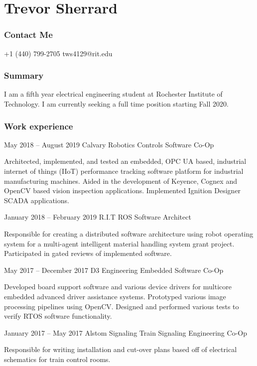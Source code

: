 \documentclass{tccv}
\begin{document}
\part{Trevor Sherrard}
\section{Contact Me}
\begin{eventlist}
    {+1 (440) 799-2705}
    {tws4129@rit.edu}
    
\end{eventlist}

\section{Summary}
I am a fifth year electrical engineering student at Rochester Institute of Technology. I am currently seeking a full time position starting Fall 2020.

\section{Work experience}

\begin{eventlist}

\item{May 2018 -- August 2019}
     {Calvary Robotics}
     {Controls Software Co-Op}

Architected, implemented, and tested an embedded, OPC UA based, industrial internet of things (IIoT) performance tracking software platform for industrial manufacturing machines. Aided in the development of Keyence, Cognex and OpenCV based vision inspection applications. Implemented Ignition Designer SCADA applications.

\item{January 2018 -- February 2019}
     {R.I.T}
     {ROS Software Architect}

Responsible for creating a distributed software architecture using robot operating system for a multi-agent intelligent material handling system grant project. Participated in gated reviews of implemented software.

\item{May 2017 -- December 2017}
     {D3 Engineering}
     {Embedded Software Co-Op}
     
Developed board support software and various device drivers for multicore embedded advanced driver assistance systems. Prototyped various image processing pipelines using OpenCV. Designed and performed various tests to verify RTOS software functionality.

\item{January 2017 -- May 2017}
     {Alstom Signaling}
     {Train Signaling Engineering Co-Op}

Responsible for writing installation and cut-over plans based off of electrical schematics for train control rooms.

\end{eventlist}
\end{document}

